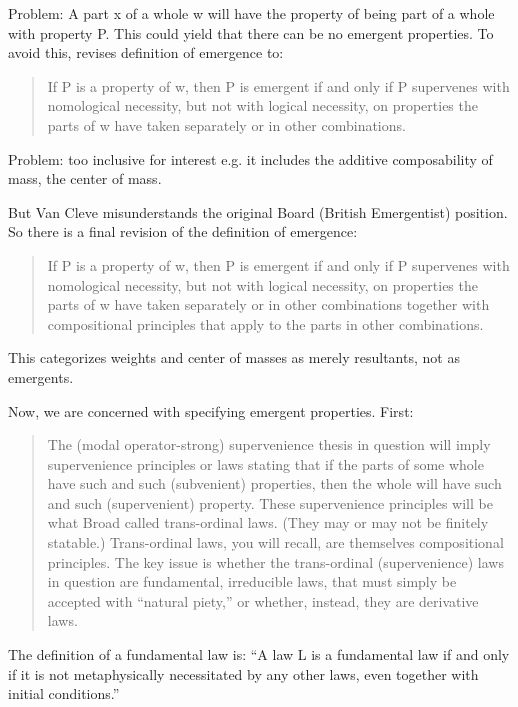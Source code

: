 \documentclass{article}
\begin{document}
Problem: A part x of a whole w will have the property of being part of a whole with property P. This could yield that there can be no emergent properties. To avoid this, revises definition of emergence to:

\begin{quote}
If P is a property of w, then P is emergent if and only if P supervenes with nomological necessity, but not with logical necessity, on properties the parts of w have taken separately or in other combinations.
\end{quote}

Problem: too inclusive for interest e.g. it includes the additive composability of mass, the center of mass.

But Van Cleve misunderstands the original Board (British Emergentist) position. So there is a final revision of the definition of emergence:

\begin{quote}
If P is a property of w, then P is emergent if and only if P supervenes with nomological necessity, but not with logical necessity, on properties the parts of w have taken separately or in other combinations together with compositional principles that apply to the parts in other combinations.
\end{quote}

This categorizes weights and center of masses as merely resultants, not as emergents.

Now, we are concerned with specifying emergent properties. First:

\begin{quote}
The (modal operator-strong) supervenience thesis in question will imply supervenience principles or laws stating that if the parts of some whole have such and such (subvenient) properties, then the whole will have such and such (supervenient) property. These supervenience principles will be what Broad called trans-ordinal laws. (They may or may not be finitely statable.) Trans-ordinal laws, you will recall, are themselves compositional principles. The key issue is whether the trans-ordinal (supervenience) laws in question are fundamental, irreducible laws, that must simply be accepted with ``natural piety,'' or whether, instead, they are derivative laws.
\end{quote}

The definition of a fundamental law is: ``A law L is a fundamental law if and only if it is not metaphysically necessitated by any other laws, even together with initial conditions.''
\end{document}
